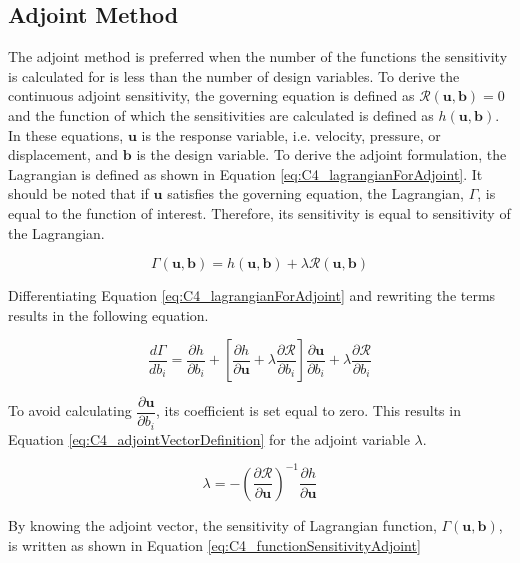 \subsection{Adjoint Method}
The adjoint method is preferred when the number of the functions the sensitivity is calculated for is less than the number of design variables. To derive the continuous adjoint sensitivity, the governing equation is defined as $\mathcal{R}(\mathbf{u}, \mathbf{b}) = 0$ and the function of which the sensitivities are calculated is defined as $h(\mathbf{u}, \mathbf{b})$. In these equations, $\mathbf{u}$ is the response variable, i.e. velocity, pressure, or displacement, and $\mathbf{b}$ is the design variable. To derive the adjoint formulation, the Lagrangian is defined as shown in Equation \eqref{eq:C4_lagrangianForAdjoint}. It should be noted that if $\mathbf{u}$ satisfies the governing equation, the Lagrangian, $\Gamma$, is equal to the function of interest. Therefore, its sensitivity is equal to sensitivity of the Lagrangian.

\begin{equation}\label{eq:C4_lagrangianForAdjoint}
	\Gamma(\mathbf{u}, \mathbf{b}) = h(\mathbf{u}, \mathbf{b}) + \lambda \mathcal{R}(\mathbf{u}, \mathbf{b})
\end{equation}

Differentiating Equation \eqref{eq:C4_lagrangianForAdjoint} and rewriting the terms results in the following equation. 

\begin{equation}
	\frac{d \Gamma}{d b_i} = 
	\frac{\partial h}{\partial b_i} + 
	\left[ \frac{\partial h}{\partial \mathbf{u}} + \lambda \frac{\partial \mathcal{R}}{\partial b_i} \right]
	\frac{\partial \textbf{u}}{\partial b_i} + 
	\lambda \frac{\partial \mathcal{R}}{\partial b_i}
\end{equation}

To avoid calculating $\dfrac{\partial \textbf{u}}{\partial b_i}$, its coefficient is set equal to zero. This results in Equation \eqref{eq:C4_adjointVectorDefinition} for the adjoint variable $\lambda$.

\begin{equation}\label{eq:C4_adjointVectorDefinition}
	\lambda = -\left( \frac{\partial \mathcal{R}}{\partial \mathbf{u}} \right)^{-1} \frac{\partial h}{\partial \mathbf{u}}
\end{equation}

By knowing the adjoint vector, the sensitivity of Lagrangian function, $\Gamma(\mathbf{u}, \mathbf{b})$, is written as shown in Equation \eqref{eq:C4_functionSensitivityAdjoint}

